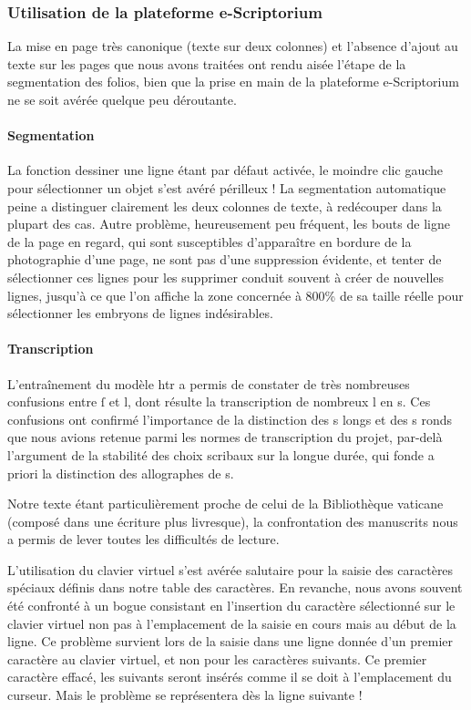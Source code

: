 \documentclass{article}
\begin{document}
\subsubsection{Utilisation de la plateforme e-Scriptorium}
La mise en page très canonique (texte sur deux colonnes) et l'absence d'ajout au texte sur les pages que nous avons traitées ont rendu aisée l'étape de la segmentation des folios, bien que la prise en main de la plateforme e-Scriptorium ne se soit avérée quelque peu déroutante.

\paragraph{Segmentation}
La fonction dessiner une ligne étant par défaut activée, le moindre clic gauche pour sélectionner un objet s'est avéré périlleux ! La segmentation automatique peine a distinguer clairement les deux colonnes de texte, à redécouper dans la plupart des cas. Autre problème, heureusement peu fréquent, les bouts de ligne de la page en regard, qui sont susceptibles d'apparaître en bordure de la photographie d'une page, ne sont pas d'une suppression évidente, et tenter de sélectionner ces lignes pour les supprimer conduit souvent à créer de nouvelles lignes, jusqu'à ce que l'on affiche la zone concernée à 800\% de sa taille réelle pour sélectionner les embryons de lignes indésirables.

\paragraph{Transcription}
L'entraînement du modèle \gls{htr} a permis de constater de très nombreuses confusions entre ſ et l, dont résulte la transcription de nombreux l en s. Ces confusions ont confirmé l'importance de la distinction des s longs et des s ronds que nous avions retenue parmi les normes de transcription du projet, par-delà l'argument de la stabilité des choix scribaux sur la longue durée, qui fonde a priori la distinction des allographes de s.

Notre texte étant particulièrement proche de celui de la Bibliothèque vaticane (composé dans une écriture plus livresque), la confrontation des manuscrits nous a permis de lever toutes les difficultés de lecture.

L'utilisation du clavier virtuel s'est avérée salutaire pour la saisie des caractères spéciaux définis dans notre table des caractères. En revanche, nous avons souvent été confronté à un bogue consistant en l'insertion du caractère sélectionné sur le clavier virtuel non pas à l'emplacement de la saisie en cours mais au début de la ligne. Ce problème survient lors de la saisie dans une ligne donnée d'un premier caractère au clavier virtuel, et non pour les caractères suivants. Ce premier caractère effacé, les suivants seront insérés comme il se doit à l'emplacement du curseur. Mais le problème se représentera dès la ligne suivante !
\end{document}
